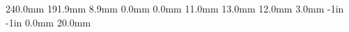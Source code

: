 \newcommand{\sh}{\hspace*{0.5mm}{\rm sh}\hspace*{0.3mm}}
\newcommand{\dash}{{\hs\prime}}
\newcommand{\npar}{\par\vspace*{10pt}}
%
\newcommand{\gPi}{\mathnormal{\Pi}}
\newcommand{\gGamma}{\mathnormal{\Gamma}}
\newcommand{\gPhi}{\mathnormal{\Phi}}
\newcommand{\gPsi}{\mathnormal{\Psi}}
\newcommand{\gTheta}{\mathnormal{\Theta}}
\newcommand{\gDelta}{\mathnormal{\Delta}}
\newcommand{\gXi}{\mathnormal{\Xi}}
\newcommand{\gLambda}{\mathnormal{\Lambda}}
\newcommand{\gOmega}{\mathnormal{\Omega}}
%
\setlength{\textheight}  {240.0mm}
\setlength{\textwidth}   {191.9mm}
\setlength{\columnsep}   {8.9mm}
\setlength{\parindent}   {0.0mm}
\setlength{\mathindent}  {0.0mm}
%
\newlength{\mybaselineskip}
\setlength{\mybaselineskip}{11pt}
\newlength{\myleftmargin}
\newlength{\mytopmargin} 
\setlength{\myleftmargin}  {11.0mm}
\setlength{\mytopmargin}   {13.0mm}
\setlength{\myleftmargin}  {12.0mm}
\setlength{\mytopmargin}   { 3.0mm}
\setlength{\oddsidemargin} {-1in}
\setlength{\topmargin}     {-1in}
\addtolength{\oddsidemargin}{\myleftmargin}
\addtolength{\topmargin}    {\mytopmargin}
\setlength{\headheight}  { 0.0mm}
\setlength{\footskip}    {20.0mm}
%
\sloppy

